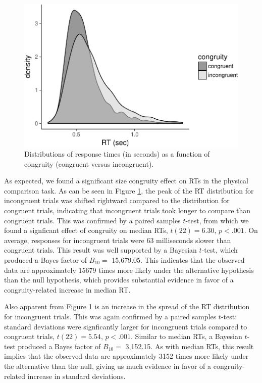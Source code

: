 \documentclass[english,man]{apa6}
\theoremstyle{definition}
\theoremstyle{definition}
\theoremstyle{definition}
\theoremstyle{remark}
\begin{document}
\begin{figure}
\centering
\includegraphics{paper_files/figure-latex/densities-1.pdf}
\caption{\label{fig:densities}Distributions of response times (in seconds)
as a function of congruity (congruent versus incongruent).}
\end{figure}

As expected, we found a significant size congruity effect on RTs in the
physical comparison task. As can be seen in Figure \ref{fig:densities},
the peak of the RT distribution for incongruent trials was shifted
rightward compared to the distribution for congruent trials, indicating
that incongruent trials took longer to compare than congruent trials.
This was confirmed by a paired samples \(t\)-test, from which we found a
signficant effect of congruity on median RTs, \(t(22) = 6.30\),
\(p < .001\). On average, responses for incongruent trials were 63
milliseconds slower than congruent trials. This result was well
supported by a Bayesian \(t\)-test, which produced a Bayes factor of
\(B_{10}=\) 15,679.05. This indicates that the observed data are
approximately 15679 times more likely under the alternative hypothesis
than the null hypothesis, which provides substantial evidence in favor
of a congruity-related increase in median RT.

Also apparent from Figure \ref{fig:densities} is an increase in the
spread of the RT distribution for incongruent trials. This was again
confirmed by a paired samples \(t\)-test: standard deviations were
signficantly larger for incongruent trials compared to congruent trials,
\(t(22) = 5.54\), \(p < .001\). Similar to median RTs, a Bayesian
\(t\)-test produced a Bayes factor of \(B_{10}=\) 3,152.15. As with
median RTs, this result implies that the observed data are approximately
3152 times more likely under the alternative than the null, giving us
much evidence in favor of a congruity-related increase in standard
deviations.
\end{document}
